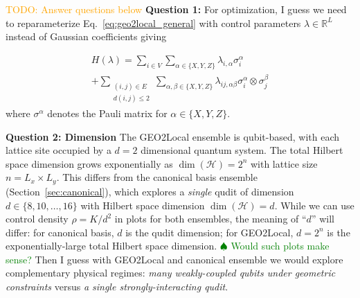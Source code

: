 \documentclass[aps,prx,reprint,superscriptaddress,footnote, twocolumn,notitlepage]{revtex4-2}
\newcommand{\tom}[1]{\textcolor{green}{#1}}
\newcommand{\ko}[1]{\textcolor{orange}{#1}}
\newcommand{\todotom}[1]{\tom{$\spadesuit$ #1}}
\begin{document}
\ko{TODO: Answer questions below}
\textbf{Question 1:}
For optimization, I guess we need to reparameterize Eq.~\eqref{eq:geo2local_general} with control parameters $\lambda \in \mathbb{R}^L$ instead of Gaussian coefficients giving

\begin{equation}
\begin{aligned}
H(\lambda) = \sum_{i \in V} \sum_{\alpha \in \{X,Y,Z\}} \lambda_{i,\alpha} \sigma_i^\alpha \\
           + \sum_{\substack{(i,j) \in E \\ d(i,j) \leq 2}} \sum_{\alpha,\beta \in \{X,Y,Z\}} \lambda_{ij,\alpha\beta} \sigma_i^\alpha \otimes \sigma_j^\beta
\end{aligned}
\label{eq:geo2local_k2}
\end{equation}
where $\sigma^\alpha$ denotes the Pauli matrix for $\alpha \in \{X, Y, Z\}$.


\textbf{Question 2: Dimension} The GEO2Local ensemble is qubit-based, with each lattice site occupied by a $d=2$ dimensional quantum system. The total Hilbert space dimension grows exponentially as $\dim(\mathcal{H}) = 2^{n}$ with lattice size $n = L_x \times L_y$. This differs from the canonical basis ensemble (Section~\ref{sec:canonical}), which explores a \emph{single} qudit of dimension $d \in \{8, 10, \ldots, 16\}$ with Hilbert space dimension $\dim(\mathcal{H}) = d$. While we can use control density $\rho = K/d^2$ in plots for both ensembles, the meaning of ``$d$'' will differ: for canonical basis, $d$ is the qudit dimension; for GEO2Local, $d = 2^n$ is the exponentially-large total Hilbert space dimension. \todotom{Would such plots make sense?} Then I guess with GEO2Local and canonical ensemble we would  explore complementary physical regimes: \emph{many weakly-coupled qubits under geometric constraints} versus \emph{a single strongly-interacting qudit}. 
\end{document}

